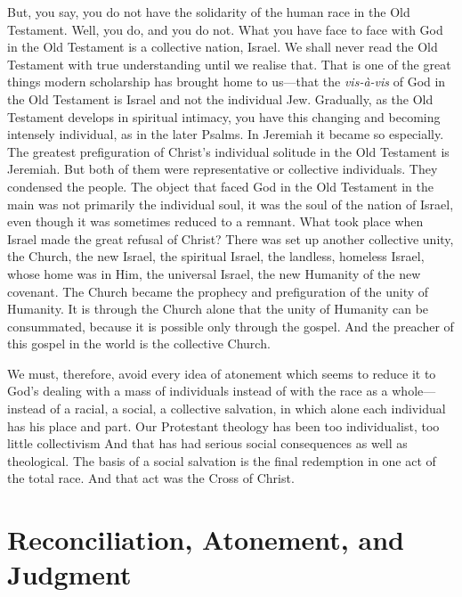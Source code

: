 \documentclass[draft]{ptfdoc}
\begin{document}
But, you say, you do not have the solidarity 
of the human race in the Old Testament. Well, 
you do, and you do not. What you have face to 
face with God in the Old Testament is a collective 
nation, Israel. We shall never read the 
Old Testament with true understanding until 
we realise that. That is one of the great things 
modern scholarship has brought home to us---that 
the \textit{vis-\`{a}-vis} of God in the Old Testament is 
Israel and not the individual Jew. Gradually, 
as the Old Testament develops in spiritual intimacy, 
you have this changing and becoming 
intensely individual, as in the later Psalms. In 
Jeremiah it became so especially. The greatest 
prefiguration of Christ's individual solitude in 
the Old Testament is Jeremiah. But both of 
them were representative or collective individuals. 
They condensed the people. The object 
that faced God in the Old Testament in the 
main was not primarily the individual soul, it 
was the soul of the nation of Israel, even 
though it was sometimes reduced to a remnant. 
What took place when Israel made the great 
refusal of Christ? There was set up another 
collective unity, the Church, the new Israel, the 
spiritual Israel, the landless, homeless Israel, 
whose home was in Him, the universal Israel, 
the new Humanity of the new covenant. The 
Church became the prophecy and prefiguration 
of the unity of Humanity. It is through the 
Church alone that the unity of Humanity can 
be consummated, because it is possible only 
through the gospel. And the preacher of this 
gospel in the world is the collective Church. 

We must, therefore, avoid every idea of atonement which seems to reduce it to God's dealing 
with a mass of individuals instead of with the 
race as a whole---instead of a racial, a social, a 
collective salvation, in which alone each individual has his place and part. Our Protestant 
theology has been too individualist, too little 
collectivism And that has had serious social 
consequences as well as theological. The basis 
of a social salvation is the final redemption in 
one act of the total race. And that act was the 
Cross of Christ. 



\chapter{Reconciliation, Atonement, and Judgment} 
\end{document}
